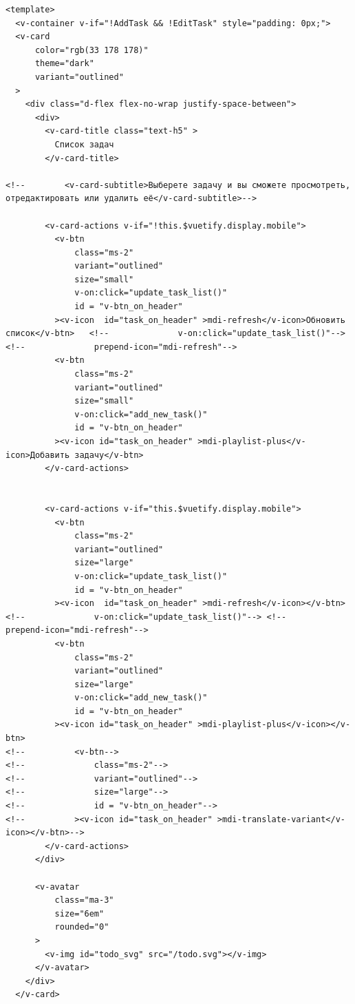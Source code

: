 \documentclass{altsu-report}
\begin{document}
\begin{code}
\label{code:pi-example}
\begin{verbatim}
<template>
  <v-container v-if="!AddTask && !EditTask" style="padding: 0px;">
  <v-card
      color="rgb(33 178 178)"
      theme="dark"
      variant="outlined"
  >
    <div class="d-flex flex-no-wrap justify-space-between">
      <div>
        <v-card-title class="text-h5" >
          Список задач
        </v-card-title>

<!--        <v-card-subtitle>Выберете задачу и вы сможете просмотреть, отредактировать или удалить её</v-card-subtitle>-->

        <v-card-actions v-if="!this.$vuetify.display.mobile">
          <v-btn
              class="ms-2"
              variant="outlined"
              size="small"
              v-on:click="update_task_list()"
              id = "v-btn_on_header"
          ><v-icon  id="task_on_header" >mdi-refresh</v-icon>Обновить список</v-btn>   <!--              v-on:click="update_task_list()"--> <!--              prepend-icon="mdi-refresh"-->
          <v-btn
              class="ms-2"
              variant="outlined"
              size="small"
              v-on:click="add_new_task()"
              id = "v-btn_on_header"
          ><v-icon id="task_on_header" >mdi-playlist-plus</v-icon>Добавить задачу</v-btn>
        </v-card-actions>


        <v-card-actions v-if="this.$vuetify.display.mobile">
          <v-btn
              class="ms-2"
              variant="outlined"
              size="large"
              v-on:click="update_task_list()"
              id = "v-btn_on_header"
          ><v-icon  id="task_on_header" >mdi-refresh</v-icon></v-btn>   <!--              v-on:click="update_task_list()"--> <!--              prepend-icon="mdi-refresh"-->
          <v-btn
              class="ms-2"
              variant="outlined"
              size="large"
              v-on:click="add_new_task()"
              id = "v-btn_on_header"
          ><v-icon id="task_on_header" >mdi-playlist-plus</v-icon></v-btn>
<!--          <v-btn-->
<!--              class="ms-2"-->
<!--              variant="outlined"-->
<!--              size="large"-->
<!--              id = "v-btn_on_header"-->
<!--          ><v-icon id="task_on_header" >mdi-translate-variant</v-icon></v-btn>-->
        </v-card-actions>
      </div>

      <v-avatar
          class="ma-3"
          size="6em"
          rounded="0"
      >
        <v-img id="todo_svg" src="/todo.svg"></v-img>
      </v-avatar>
    </div>
  </v-card>




\end{verbatim}
\end{code}
\end{document}
